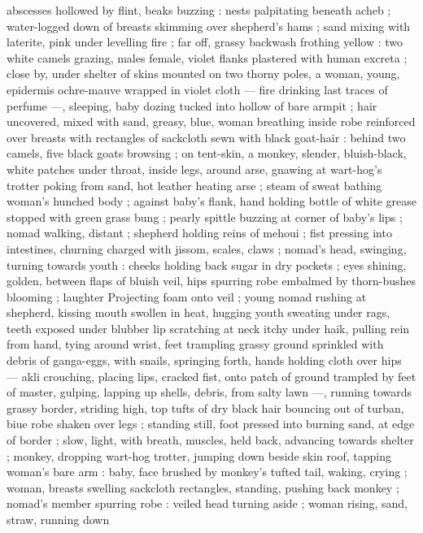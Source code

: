 abscesses hollowed by flint, beaks buzzing : nests palpitating 
beneath acheb ; water-logged down of breasts skimming over 
shepherd's hams ; sand mixing with laterite, pink under levelling fire 
; far off, grassy backwash frothing yellow : two white camels grazing, 
males female, violet flanks plastered with human excreta ; close by, 
under shelter of skins mounted on two thorny poles, a woman, 
young, epidermis ochre-mauve wrapped in violet cloth --- fire 
drinking last traces of perfume ---, sleeping, baby dozing tucked into 
hollow of bare armpit ; hair uncovered, mixed with sand, greasy, 
blue, woman breathing inside robe reinforced over breasts with 
rectangles of sackcloth sewn with black goat-hair : behind two 
camels, five black goats browsing ; on tent-skin, a monkey, slender, 
bluish-black, white patches under throat, inside legs, around arse, 
gnawing at wart-hog's trotter poking from sand, hot leather heating 
arse ; steam of sweat bathing woman's hunched body ; against 
baby's flank, hand holding bottle of white grease stopped with green 
grass bung ; pearly spittle buzzing at corner of baby's lips ; nomad 
walking, distant ; shepherd holding reins of mehoui ; fist pressing 
into intestines, churning charged with jissom, scales, claws ; nomad's 
head, swinging, turning towards youth : cheeks holding back sugar 
in dry pockets ; eyes shining, golden, between flaps of bluish veil, 
hips spurring robe embalmed by thorn-bushes blooming ; laughter 
Projecting foam onto veil ; young nomad rushing at shepherd, kissing 
mouth swollen in heat, hugging youth sweating under rags, teeth 
exposed under blubber lip scratching at neck itchy under haik, 
pulling rein from hand, tying around wrist, feet trampling grassy 
ground sprinkled with debris of ganga-eggs, with snails, springing 
forth, hands holding cloth over hips --- akli crouching, placing lips, 
cracked fist, onto patch of ground trampled by feet of master, 
gulping, lapping up shells, debris, from salty lawn ---, running 
towards grassy border, striding high, top tufts of dry black hair 
bouncing out of turban, biue robe shaken over legs ; standing still, 
foot pressed into burning sand, at edge of border ; slow, light, with 
breath, muscles, held back, advancing towards shelter ; monkey, 
dropping wart-hog trotter, jumping down beside skin roof, tapping 
woman's bare arm : baby, face brushed by monkey's tufted tail, 
waking, crying ; woman, breasts swelling sackcloth rectangles, 
standing, pushing back monkey ; nomad's member spurring robe : 
veiled head turning aside ; woman rising, sand, straw, running down 
